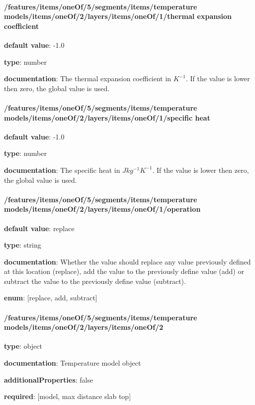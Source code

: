 \begin{itemized}
\end{itemized}\paragraph{/features/items/oneOf/5/segments/items/temperature models/items/oneOf/2/layers/items/oneOf/1/thermal expansion coefficient} \begin{itemized}
\item {\bf default value}: -1.0
\item {\bf type}: number
\item {\bf documentation}: The thermal expansion coefficient in $K^{-1}$. If the value is lower then zero, the global value is used.
\end{itemized}\paragraph{/features/items/oneOf/5/segments/items/temperature models/items/oneOf/2/layers/items/oneOf/1/specific heat} \begin{itemized}
\item {\bf default value}: -1.0
\item {\bf type}: number
\item {\bf documentation}: The specific heat in $J kg^{-1} K^{-1}$. If the value is lower then zero, the global value is used.
\end{itemized}\paragraph{/features/items/oneOf/5/segments/items/temperature models/items/oneOf/2/layers/items/oneOf/1/operation} \begin{itemized}
\item {\bf default value}: replace
\item {\bf type}: string
\item {\bf documentation}: Whether the value should replace any value previously defined at this location (replace), add the value to the previously define value (add) or subtract the value to the previously define value (subtract).
\item {\bf enum}: [replace, add, subtract]\end{itemized}\paragraph{/features/items/oneOf/5/segments/items/temperature models/items/oneOf/2/layers/items/oneOf/2} \begin{itemized}
\item {\bf type}: object
\item {\bf documentation}: Temperature model object
\item {\bf additionalProperties}: false
\item {\bf required}: [model, max distance slab top]\end{itemized}
